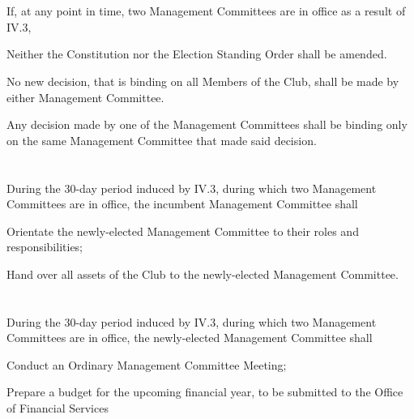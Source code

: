 
\section{}
If, at any point in time, two Management Committees are in office as a result of IV.3,
	\begin{legal}
	\item Neither the Constitution nor the Election Standing Order shall be amended.
	\item No new decision, that is binding on all Members of the Club, shall be made by either Management Committee.
	\item Any decision made by one of the Management Committees shall be binding only on the same Management Committee that made said decision.
	\end{legal}

\section{}
During the 30-day period induced by IV.3, during which two Management Committees are in office, the incumbent Management Committee shall
	\begin{legal}
	\item Orientate the newly-elected Management Committee to their roles and responsibilities;
	\item Hand over all assets of the Club to the newly-elected Management Committee.
	\end{legal}

\section{}
During the 30-day period induced by IV.3, during which two Management Committees are in office, the newly-elected Management Committee shall
\begin{legal}
	\item Conduct an Ordinary Management Committee Meeting;
	\item Prepare a budget for the upcoming financial year, to be submitted to the Office of Financial Services
\end{legal}
